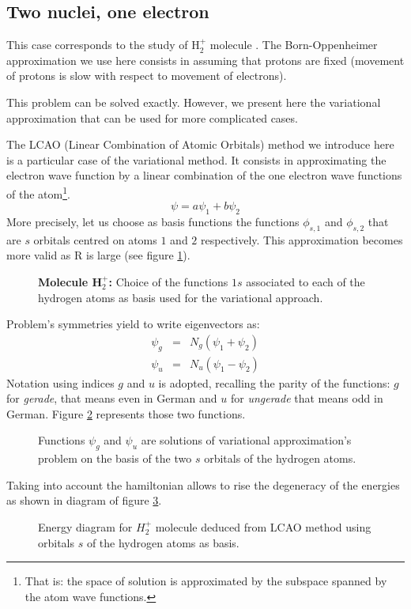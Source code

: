 \documentclass[12pt]{book}
\begin{document}
\subsection{Two nuclei, one electron}
This case corresponds to the study of H$_2^+$ molecule
\cite{ph:mecaq:Pauling60,ph:mecaq:Cohen73}. 
The  Born-Oppenheimer approximation we use here consists in assuming that
protons are fixed (movement of protons is slow with respect to
movement of electrons). 
\begin{rem} This problem can be solved exactly. However, we present here the
  variational approximation that can be used for more complicated cases.
\end{rem}
The LCAO (Linear Combination of Atomic Orbitals) method we introduce here is a
particular case of the variational method. It consists in
approximating the electron wave function by a linear combination of
the one electron wave functions of the 
atom\footnote{That is: the space of solution is approximated by the
subspace spanned by the atom wave functions.}.  
\begin{equation}
\psi=a\psi_1+b\psi_2
\end{equation}
More precisely, let us choose as basis functions the functions
$\phi_{s,1}$ and $\phi_{s,2}$ that are $s$ orbitals centred on atoms $1$ and
$2$ respectively. This approximation becomes more valid as R is large (see
figure \ref{figH2plusS}).
\begin{figure}[htb]
 \centerline{}   
 \caption{{\bf Molecule H$^+_2$:} Choice of the functions $1s$
 associated to each of the hydrogen 
   atoms as basis used for the variational approach.}
 \label{figH2plusS}
\end{figure}
Problem's symmetries yield to write eigenvectors as:
\begin{eqnarray}
\psi_g&=&N_g(\psi_1+\psi_2)\\
\psi_u&=&N_u(\psi_1-\psi_2)
\end{eqnarray}
Notation using indices $g$ and $u$  is adopted, recalling the parity of the
functions: $g$ for {\it gerade}, that means even in German and
$u$ for {\it ungerade} that means odd in German. Figure
\ref{figH2plusLCAO} represents those two functions.
\begin{figure}[htb]
 
 \caption{Functions $\psi_g$ and $\psi_u$ are solutions of variational
   approximation's problem on the basis of the two $s$ orbitals of the
   hydrogen atoms.}
 \label{figH2plusLCAO}
\end{figure}
Taking into account the hamiltonian allows to rise the degeneracy of the
energies as shown in diagram of figure \ref{figH2plusLCAOener}.
\begin{figure}[htb]
 \caption{Energy diagram for $H_2^+$ molecule deduced from LCAO method using
  orbitals $s$ of the hydrogen atoms as basis.}
 \label{figH2plusLCAOener}
\end{figure}
\end{document}
